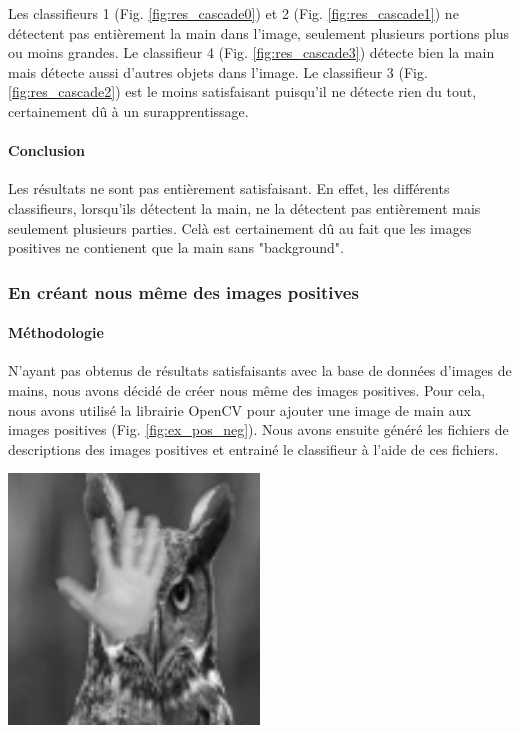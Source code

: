 \documentclass[11pt]{article}
\begin{document}
\bigbreak

Les classifieurs 1 (Fig. \ref{fig:res_cascade0}) et 2 (Fig. \ref{fig:res_cascade1}) ne détectent pas entièrement la main dans l'image, seulement plusieurs portions plus ou moins grandes. Le classifieur 4 (Fig. \ref{fig:res_cascade3}) détecte bien la main mais détecte aussi d'autres objets dans l'image. Le classifieur 3 (Fig. \ref{fig:res_cascade2}) est le moins satisfaisant puisqu'il ne détecte rien du tout, certainement dû à un surapprentissage. \bigbreak

\paragraph{Conclusion}
Les résultats ne sont pas entièrement satisfaisant. En effet, les différents classifieurs, lorsqu'ils détectent la main, ne la détectent pas entièrement mais seulement plusieurs parties. Celà est certainement dû au fait que les images positives ne contienent que la main sans "background". \bigbreak

\subsubsection{En créant nous même des images positives}
\paragraph{Méthodologie}
N'ayant pas obtenus de résultats satisfaisants avec la base de données d'images de mains, nous avons décidé de créer nous même des images positives. Pour cela, nous avons utilisé la librairie OpenCV pour ajouter une image de main aux images positives (Fig. \ref{fig:ex_pos_neg}). Nous avons ensuite généré les fichiers de descriptions des images positives et entrainé le classifieur à l'aide de ces fichiers. \bigbreak

\begin{center}
    \includegraphics[width=0.5\textwidth]{images/ex_pos_neg.jpg}
    \label{fig:ex_pos_neg}
\end{center}
\end{document}
